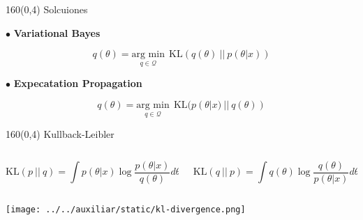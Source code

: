 \documentclass[shownotes,aspectratio=169]{beamer}
\begin{document}
\begin{frame}[plain]
\begin{textblock}{160}(0,4)
\centering \Large Solcuiones
\end{textblock}

$\bullet$ \textbf{Variational Bayes}

\begin{equation*}
 q(\theta) = \underset{q \in \mathcal{Q}}{\text{arg min}} \ \ \text{KL}(q(\theta) \ || \ p(\theta|x))
\end{equation*}

\pause
\vspace{0.5cm}

$\bullet$ \textbf{Expecatation Propagation}

\begin{equation*}
 q(\theta) = \underset{q \in \mathcal{Q}}{\text{arg min}} \ \ \text{KL}(p(\theta|x) \ || \  q(\theta))
\end{equation*}

\end{frame}

\begin{frame}[plain]
 \begin{textblock}{160}(0,4)
\centering \Large Kullback-Leibler
\end{textblock}
\vspace{0.5cm}

\begin{columns}[t]
\begin{column}{0.5\textwidth}
\centering


 \begin{equation*}
 \text{KL}( p \ || \ q) = 
\int p(\theta|x) \log \frac{p(\theta|x)}{q(\theta)} d\theta
\end{equation*}

 \end{column}
 \begin{column}{0.5\textwidth}
\centering


\begin{equation*}
 \text{KL}(q \ || \ p) =  \int q(\theta) \log \frac{q(\theta)}{p(\theta|x)} d\theta
\end{equation*}

 
\end{column}
\end{columns}

 \vspace{0.5cm}

 \centering
 \texttt{[image: ../../auxiliar/static/kl-divergence.png]}
 
 
\end{frame}
\end{document}
